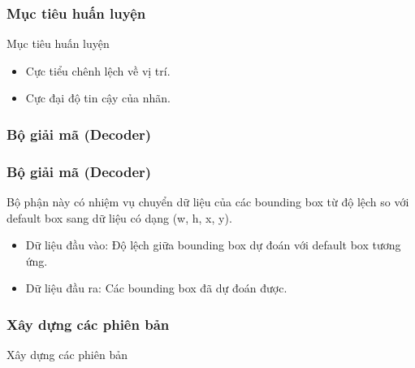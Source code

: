 \documentclass{beamer}
\begin{document}
	\begin{frame}
		\frametitle{Mục tiêu huấn luyện}
		\begin{block}{Mục tiêu huấn luyện}
			\begin{itemize}
				\item Cực tiểu chênh lệch về vị trí.
				\item Cực đại độ tin cậy của nhãn.
			\end{itemize}
		\end{block}
		
	\end{frame}
	
	
	\subsubsection{Bộ giải mã (Decoder)}
	
	\begin{frame}
		\frametitle{Bộ giải mã (Decoder)}
		Bộ phận này có nhiệm vụ chuyển dữ liệu của các bounding box từ độ lệch so với default box sang dữ liệu có dạng (w, h, x, y).
		
		\begin{itemize}
			\item Dữ liệu đầu vào: Độ lệch giữa bounding box dự đoán với default box tương ứng.
			
			\item Dữ liệu đầu ra: Các bounding box đã dự đoán được.
			
		\end{itemize}
	\end{frame}
	
	
	\begin{frame}
		\frametitle{Xây dựng các phiên bản}
		{\Huge Xây dựng các phiên bản}
	\end{frame}
	
\end{document}
